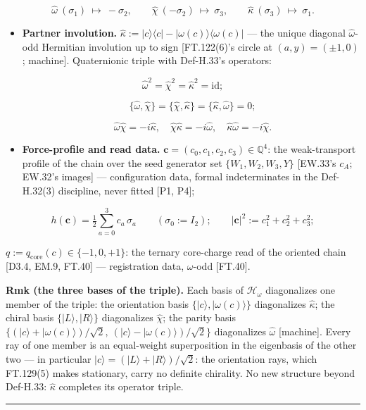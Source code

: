 \begin{definition}
\[
\hat\omega\ (\sigma_1)\ \mapsto\ -\sigma_2,\qquad\hat\chi\ (-\sigma_2)\ \mapsto\ \sigma_3,\qquad\hat\kappa\ (\sigma_3)\ \mapsto\ \sigma_1.
\]

\begin{itemize}
\item \textbf{Partner involution.} $\hat\kappa:=|c\rangle\langle c|-|\omega(c)\rangle\langle\omega(c)|$ — the unique diagonal $\hat\omega$-odd Hermitian involution up to sign [FT.122(6)'s circle at $(a,y)=(\pm1,0)$; machine]. Quaternionic triple with Def-H.33's operators:
\end{itemize}

\[
\hat\omega^2=\hat\chi^2=\hat\kappa^2=\mathrm{id};
\]

\[
\qquad \{\hat\omega,\hat\chi\}=\{\hat\chi,\hat\kappa\}=\{\hat\kappa,\hat\omega\}=0;
\]

\[
\qquad \hat\omega\hat\chi=-i\hat\kappa,\quad\hat\chi\hat\kappa=-i\hat\omega,\quad\hat\kappa\hat\omega=-i\hat\chi.
\]

\begin{itemize}
\item \textbf{Force-profile and read data.} $\mathbf c=(c_0,c_1,c_2,c_3)\in\mathbb Q^4$: the weak-transport profile of the chain over the seed generator set $\{W_1,W_2,W_3,Y\}$ [EW.33's $c_A$; EW.32's images] — configuration data, formal indeterminates in the Def-H.32(3) discipline, never fitted [P1, P4];
\end{itemize}

\[
h(\mathbf c)=\tfrac12\sum_{a=0}^{3}c_a\,\sigma_a\qquad(\sigma_0:=I_2);\qquad|\mathbf c|^2:=c_1^2+c_2^2+c_3^2;
\]

$q:=q_{\mathrm{core}}(c)\in\{-1,0,+1\}$: the ternary core-charge read of the oriented chain [D3.4, EM.9, FT.40] — registration data, $\omega$-odd [FT.40].

\textbf{Rmk (the three bases of the triple).} Each basis of $\mathcal H_\omega$ diagonalizes one member of the triple: the orientation basis $\{|c\rangle,|\omega(c)\rangle\}$ diagonalizes $\hat\kappa$; the chiral basis $\{|L\rangle,|R\rangle\}$ diagonalizes $\hat\chi$; the parity basis $\{(|c\rangle+|\omega(c)\rangle)/\sqrt2,\ (|c\rangle-|\omega(c)\rangle)/\sqrt2\}$ diagonalizes $\hat\omega$ [machine]. Every ray of one member is an equal-weight superposition in the eigenbasis of the other two — in particular $|c\rangle=(|L\rangle+|R\rangle)/\sqrt2$: the orientation rays, which FT.129(5) makes stationary, carry no definite chirality. No new structure beyond Def-H.33: $\hat\kappa$ completes its operator triple.

\vspace{2pt}\noindent\rule{\textwidth}{0.4pt}\vspace{2pt}

\end{definition}

